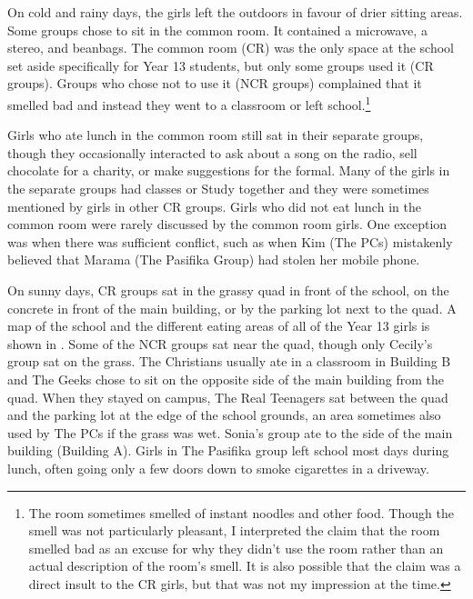 On cold and rainy days, the girls left the outdoors in favour of drier sitting areas. Some groups chose to sit in the common room. It contained a microwave, a stereo, and beanbags. The common room (CR) was the only space at the school set aside specifically for Year 13 students, but only some groups used it (CR groups). Groups who chose not to use it (NCR groups) complained that it smelled bad and instead they went to a classroom or left school.\footnote{The room sometimes smelled of instant noodles and other food. Though the smell was not particularly pleasant, I interpreted the claim that the room smelled bad as an excuse for why they didn't use the room rather than an actual description of the room's smell. It is also possible that the claim was a direct insult to the CR girls, but that was not my impression at the time.} 

Girls who ate lunch in the common room still sat in their separate groups, though they occasionally interacted to ask about a song on the radio, sell chocolate for a charity, or make suggestions for the formal. Many of the girls in the separate groups had classes or Study together and they were sometimes mentioned by girls in other CR groups. Girls who did not eat lunch in the common room were rarely discussed by the common room girls. One exception was when there was sufficient conflict, such as when Kim (The PCs) mistakenly believed that Marama (The Pasifika Group) had stolen her mobile phone. 




On sunny days, CR groups sat in the grassy quad in front of the school, on the concrete in front of the main building, or by the parking lot next to the quad. A map of the school and the different eating areas of all of the Year 13 girls is shown in . Some of the NCR groups sat near the quad, though only Cecily's group sat on the grass. The Christians usually ate in a classroom in Building B and The Geeks chose to sit on the opposite side of the main building from the quad. When they stayed on campus, The Real Teenagers sat between the quad and the parking lot at the edge of the school grounds, an area sometimes also used by The PCs if the grass was wet. Sonia's group ate to the side of the main building (Building A). Girls in The Pasifika group left school most days during lunch, often going only a few doors down to smoke cigarettes in a driveway. 

